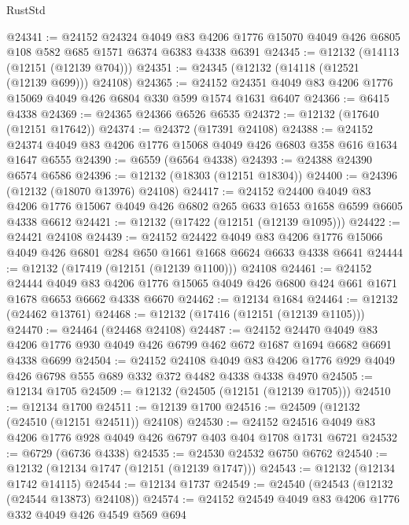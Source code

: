 \begin{lexlean}{RustStd}
\begin{coremodule}
@24341 := @24152
    @24324
    @4049
    @83
    @4206
    @1776
    @15070
    @4049
    @426
    @6805
    @108
    @582
    @685
    @1571
    @6374
    @6383
    @4338
    @6391
@24345 := @12132 (@14113 (@12151 (@12139 @704)))
@24351 := @24345 (@12132 (@14118 (@12521 (@12139 @699))) @24108)
@24365 := @24152 @24351 @4049 @83 @4206 @1776 @15069 @4049 @426 @6804 @330 @599 @1574 @1631 @6407
@24366 := @6415 @4338
@24369 := @24365 @24366 @6526 @6535
@24372 := @12132 (@17640 (@12151 @17642))
@24374 := @24372 (@17391 @24108)
@24388 := @24152 @24374 @4049 @83 @4206 @1776 @15068 @4049 @426 @6803 @358 @616 @1634 @1647 @6555
@24390 := @6559 (@6564 @4338)
@24393 := @24388 @24390 @6574 @6586
@24396 := @12132 (@18303 (@12151 @18304))
@24400 := @24396 (@12132 (@18070 @13976) @24108)
@24417 := @24152
    @24400
    @4049
    @83
    @4206
    @1776
    @15067
    @4049
    @426
    @6802
    @265
    @633
    @1653
    @1658
    @6599
    @6605
    @4338
    @6612
@24421 := @12132 (@17422 (@12151 (@12139 @1095)))
@24422 := @24421 @24108
@24439 := @24152
    @24422
    @4049
    @83
    @4206
    @1776
    @15066
    @4049
    @426
    @6801
    @284
    @650
    @1661
    @1668
    @6624
    @6633
    @4338
    @6641
@24444 := @12132 (@17419 (@12151 (@12139 @1100))) @24108
@24461 := @24152
    @24444
    @4049
    @83
    @4206
    @1776
    @15065
    @4049
    @426
    @6800
    @424
    @661
    @1671
    @1678
    @6653
    @6662
    @4338
    @6670
@24462 := @12134 @1684
@24464 := @12132 (@24462 @13761)
@24468 := @12132 (@17416 (@12151 (@12139 @1105)))
@24470 := @24464 (@24468 @24108)
@24487 := @24152
    @24470
    @4049
    @83
    @4206
    @1776
    @930
    @4049
    @426
    @6799
    @462
    @672
    @1687
    @1694
    @6682
    @6691
    @4338
    @6699
@24504 := @24152
    @24108
    @4049
    @83
    @4206
    @1776
    @929
    @4049
    @426
    @6798
    @555
    @689
    @332
    @372
    @4482
    @4338
    @4338
    @4970
@24505 := @12134 @1705
@24509 := @12132 (@24505 (@12151 (@12139 @1705)))
@24510 := @12134 @1700
@24511 := @12139 @1700
@24516 := @24509 (@12132 (@24510 (@12151 @24511)) @24108)
@24530 := @24152 @24516 @4049 @83 @4206 @1776 @928 @4049 @426 @6797 @403 @404 @1708 @1731 @6721
@24532 := @6729 (@6736 @4338)
@24535 := @24530 @24532 @6750 @6762
@24540 := @12132 (@12134 @1747 (@12151 (@12139 @1747)))
@24543 := @12132 (@12134 @1742 @14115)
@24544 := @12134 @1737
@24549 := @24540 (@24543 (@12132 (@24544 @13873) @24108))
@24574 := @24152
    @24549
    @4049
    @83
    @4206
    @1776
    @332
    @4049
    @426
    @4549
    @569
    @694

\end{coremodule}
\end{lexlean}

